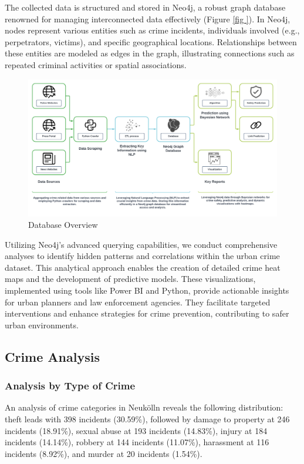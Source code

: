 The collected data is structured and stored in Neo4j, a robust graph database renowned for managing interconnected data effectively (Figure \ref{fig
}). In Neo4j, nodes represent various entities such as crime incidents, individuals involved (e.g., perpetrators, victims), and specific geographical locations. Relationships between these entities are modeled as edges in the graph, illustrating connections such as repeated criminal activities or spatial associations.

\begin{figure}[h]
	\centering
	\includegraphics[width=\textwidth]{./figures/intro_rishabh/Data_urbview.png}
	\caption{Database Overview}
	\label{fig}
\end{figure}

Utilizing Neo4j's advanced querying capabilities, we conduct comprehensive analyses to identify hidden patterns and correlations within the urban crime dataset. This analytical approach enables the creation of detailed crime heat maps and the development of predictive models. These visualizations, implemented using tools like Power BI and Python, provide actionable insights for urban planners and law enforcement agencies. They facilitate targeted interventions and enhance strategies for crime prevention, contributing to safer urban environments.
\subsection{Crime Analysis}

\subsubsection{Analysis by Type of Crime}
An analysis of crime categories in Neukölln reveals the following distribution: theft leads with 398 incidents (30.59\%), followed by damage to property at 246 incidents (18.91\%), sexual abuse at 193 incidents (14.83\%), injury at 184 incidents (14.14\%), robbery at 144 incidents (11.07\%), harassment at 116 incidents (8.92\%), and murder at 20 incidents (1.54\%).

